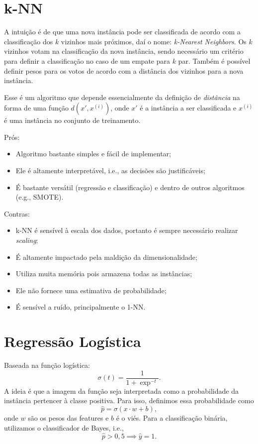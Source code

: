 
\section*{k-NN}

A intuição é de que uma nova instância pode ser classificada de acordo com a classificação dos $k$ vizinhos mais próximos, daí o nome: \emph{k-Nearest Neighbors}. Os $k$ vizinhos votam na classificação da nova instância, sendo necessário um critério para definir a classificação no caso de um empate para $k$ par. Também é possível definir pesos para os votos de acordo com a distância dos vizinhos para a nova instância.

Esse é um algoritmo que depende essencialmente da definição de \emph{distância} na forma de uma função $d\left( x',x^{(i)} \right) $, onde $x'$ é a instância a ser classificada e  $x^{(i)}$ é uma instância no conjunto de treinamento.

Prós:
\begin{itemize}
    \item Algoritmo bastante simples e fácil de implementar;
    \item Ele é altamente interpretável, i.e., as decisões são justificáveis;
    \item É bastante versátil (regressão e classificação) e dentro de outros algoritmos (e.g., SMOTE).
\end{itemize}
Contras:
\begin{itemize}
    \item k-NN é sensível à escala dos dados, portanto é sempre necessário realizar \emph{scaling};
    \item É altamente impactado pela maldição da dimensionalidade;
    \item Utiliza muita memória pois armazena todas as instâncias;
    \item Ele não fornece uma estimativa de probabilidade;
    \item É sensível a ruído, principalmente o 1-NN.
\end{itemize}

\section*{Regressão Logística}

Baseada na função logística: \[
\sigma(t) = \frac{1}{1+\exp^{-t}}
.\] A ideia é que a imagem da função seja interpretada como a probabilidade da instância pertencer à classe positiva. Para isso, definimos essa probabilidade como \[
\hat{p} = \sigma\left( x\cdot w + b \right) 
,\] onde $w$ são os pesos das features e $b$ é o viés. Para a classificação binária, utilizamos o classificador de Bayes, i.e., \[
\hat{p} > 0,5 \implies \hat{y} = 1
.\] 

